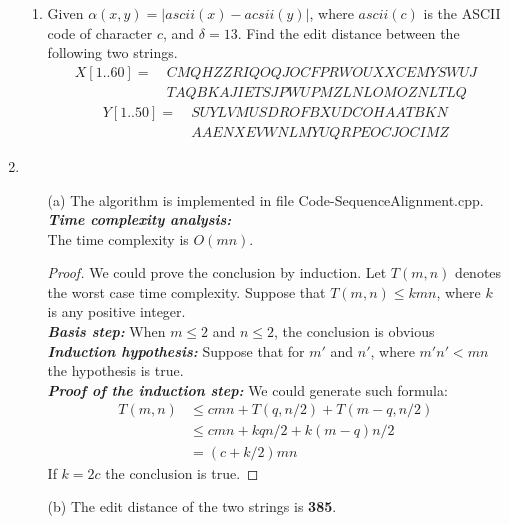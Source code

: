 \documentclass[12pt,a4paper]{article}
\makeatletter
\newtheorem*{solution}{Solution}
\theoremstyle{definition}
\renewenvironment{solution}[1][Solution] {\par\pushQED{\qed}\normalfont\topsep6\p@\@plus6\p@\relax\trivlist\item[\hskip\labelsep\bfseries#1\@addpunct{.}]\ignorespaces}{\popQED\endtrivlist\@endpefalse} \makeatother
\makeatother
\begin{document}
\begin{enumerate}
\begin{enumerate}
    	\item
    	Given $\alpha(x, y) = |ascii(x) - acsii(y)|$, where $ascii(c)$ is the ASCII code of character $c$, and $\delta=13$. Find the edit distance between the following two strings.
    	\begin{align*}
    		X[1..60]=&\ CMQHZZRIQOQJOCFPRWOUXXCEMYSWUJ\\
    		&\ TAQBKAJIETSJPWUPMZLNLOMOZNLTLQ	
    	\end{align*}
    	\begin{align*}
    		Y[1..50]=&\ SUYLVMUSDROFBXUDCOHAATBKN\\
    		&\ AAENXEVWNLMYUQRPEOCJOCIMZ
    	\end{align*}
    \end{enumerate}
    \begin{solution}
    ~\\
    \begin{enumerate}
        \item [(a)] The algorithm is implemented in file Code-SequenceAlignment.cpp.
        \\
        \textbf{\textit{Time complexity analysis:}}
        \\
        The time complexity is $O(mn)$.
        \begin{proof}
        We could prove the conclusion by induction. Let $T(m,n)$ denotes the worst case time complexity. Suppose that $T(m,n)\leq kmn$, where $k$ is any positive integer. 
        \\
        \textbf{\textit{Basis step:}}
        When $m\leq 2$ and $n\leq 2$, the conclusion is obvious
        \\
        \textbf{\textit{Induction hypothesis:}} Suppose that for $m'$ and $n'$, where $m'n' < mn$ the hypothesis is true.
        \\
        \textbf{\textit{Proof of the induction step:}}
        We could generate such formula:
        \begin{equation}
            \begin{split}
                T(m,n) &\leq cmn+T(q,n/2)+T(m-q,n/2)\\
                       &\leq cmn+kqn/2+k(m-q)n/2\\
                       &=(c+k/2)mn
            \end{split}
        \end{equation}
        If $k=2c$ the conclusion is true.
        \end{proof}
        \item [(b)] The edit distance of the two strings is \textbf{385}.
    \end{enumerate}
    \end{solution}
    

\end{enumerate}
\end{document}
